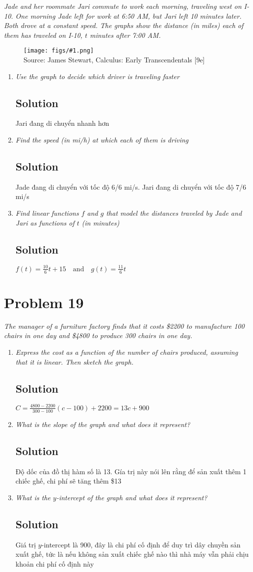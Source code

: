 \documentclass[11pt]{article}
\newcommand{\soln}{\subsection*}
\newcommand{\qn}{\textit}
\newcommand{\imagesource}[1]{{\footnotesize Source: #1}}
\newcommand{\imgqn}[1]{
	\begin{figure}[H]
		\centering
		\texttt{[image: figs/\#1.png]}\\
		\imagesource{James Stewart, Calculus: Early Transcendentals [9e]}
	\end{figure}
}
\begin{document}
\qn{Jade and her roommate Jari commute to work each morning, traveling west on I-10. One morning Jade left for work at 6:50 AM, but Jari left 10 minutes later. Both drove at a constant speed. The graphs show the distance (in miles) each of them has traveled on I-10, $t$ minutes after 7:00 AM.}

\imgqn{1.2.18}

\begin{enumerate}
	\item \qn{Use the graph to decide which driver is traveling faster}
	\soln{Solution}
	Jari đang di chuyển nhanh hơn
	
	\item \qn{Find the speed (in mi/h) at which each of them is driving}
	\soln{Solution}
	Jade đang di chuyển với tốc độ 6/6 mi/s. Jari đang di chuyển với tốc độ 7/6 mi/s
	
	\item \qn{Find linear functions $f$ and $g$ that model the distances traveled by Jade and Jari as functions of $t$ (in minutes)}
	\soln{Solution}
	$f(t)=\frac{10}{6}t+15 \quad \text{and} \quad g(t)=\frac{11}{6}t$
\end{enumerate}

\section*{Problem 19}

\qn{The manager of a furniture factory finds that it costs \$2200 to manufacture 100 chairs in one day and \$4800 to produce 300 chairs in one day.}

\begin{enumerate}
	\item \qn{Express the cost as a function of the number of chairs produced, assuming that it is linear. Then sketch the graph.}
	\soln{Solution}
	$C=\frac{4800-2200}{300-100}(c-100)+2200=13c+900$
	
	\item \qn{What is the slope of the graph and what does it represent?}
	\soln{Solution}
	Độ dốc của đồ thị hàm số là 13. Gía trị này nói lên rằng để sản xuất thêm 1 chiếc ghế, chi phí sẽ tăng thêm \$13
	
	\item \qn{What is the $y$-intercept of the graph and what does it represent?}
	\soln{Solution}
	Giá trị $y$-intercept là 900, đây là chi phí cố định để duy trì dây chuyền sản xuất ghế, tức là nếu không sản xuất chiếc ghế nào thì nhà máy vẫn phải chịu khoản chi phí cố định này
\end{enumerate}
\end{document}

